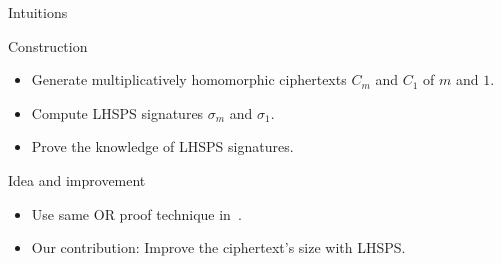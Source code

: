 \begin{frame}{Intuitions}
  \begin{block}{Construction}
  \begin{itemize}
  \item Generate multiplicatively homomorphic ciphertexts $C_m$ and $C_1$ of $m$ and $1$.
  \item Compute LHSPS signatures $\sigma_m$ and $\sigma_1$.
  \item Prove the knowledge of LHSPS signatures.
  \end{itemize}
  \end{block}
  \pause
  \begin{block}{Idea and improvement}
    \begin{itemize}
    \item Use same OR proof technique in~\cite{DBLP:conf/eurocrypt/ChaseKLM12}.
    \item Our contribution: {\color{red}Improve the ciphertext's size with LHSPS}.
    \end{itemize}
  \end{block}

  
\end{frame}



